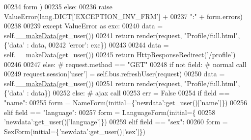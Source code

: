 \begin{DoxyCode}
00234                                                         form )
00235                 \textcolor{keywordflow}{else}:
00236                     \textcolor{keywordflow}{raise} ValueError(lang.DICT[\textcolor{stringliteral}{'EXCEPTION\_INV\_FRM'}] + 
00237                                         \textcolor{stringliteral}{":"} + form.errors)
00238 
00239             \textcolor{keywordflow}{except} ValueError \textcolor{keyword}{as} exc:
00240                 data = self.\hyperlink{classProfile_1_1ProfileUnit_1_1UiFullProfile_ae0e9c54df37ab45f0d1c5d894181d10f}{\_\_makeData}(get\_user())
00241                 \textcolor{keywordflow}{return} render(request, \textcolor{stringliteral}{"Profile/full.html"}, \{\textcolor{stringliteral}{'data'} : data,
00242                                                              \textcolor{stringliteral}{'error'}: exc\})
00243 
00244             data = self.\hyperlink{classProfile_1_1ProfileUnit_1_1UiFullProfile_ae0e9c54df37ab45f0d1c5d894181d10f}{\_\_makeData}(get\_user())
00245             \textcolor{keywordflow}{return} HttpResponseRedirect(\textcolor{stringliteral}{'/profile'})
00246 
00247         \textcolor{keywordflow}{else}: \textcolor{comment}{# request.method == "GET"}
00248             \textcolor{keywordflow}{if} \textcolor{keywordflow}{not} field: \textcolor{comment}{# normal call}
00249                 request.session[\textcolor{stringliteral}{'user'}] = self.bus.refreshUser(request)
00250                 data = self.\hyperlink{classProfile_1_1ProfileUnit_1_1UiFullProfile_ae0e9c54df37ab45f0d1c5d894181d10f}{\_\_makeData}(get\_user())
00251                 \textcolor{keywordflow}{return} render(request, \textcolor{stringliteral}{"Profile/full.html"}, \{\textcolor{stringliteral}{'data'} : data\})
00252             \textcolor{keywordflow}{else}: \textcolor{comment}{# ajax call}
00253                 err = \textcolor{keyword}{False}
00254                 \textcolor{keywordflow}{if}   field == \textcolor{stringliteral}{"name"}:
00255                     form = NameForm(initial=\{\textcolor{stringliteral}{'newdata'}:get\_user()[\textcolor{stringliteral}{'name'}]\})
00256                 \textcolor{keywordflow}{elif} field == \textcolor{stringliteral}{"language"}:
00257                     form = LanguageForm(initial=\{
00258                             \textcolor{stringliteral}{'newdata'}:get\_user()[\textcolor{stringliteral}{'language'}]\})
00259                 \textcolor{keywordflow}{elif} field == \textcolor{stringliteral}{"sex"}:
00260                     form = SexForm(initial=\{\textcolor{stringliteral}{'newdata'}:get\_user()[\textcolor{stringliteral}{'sex'}]\})

\end{DoxyCode}
